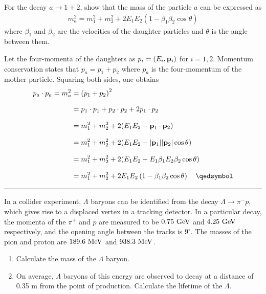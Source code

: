 
\begin{problem}{2.6}\label{p2.6}
   For the decay $a\to1+2$, show that the mass of the particle $a$ can be expressed as 
   \begin{align*}
        m_a^2 = m_1^2+m_2^2 + 2E_1E_2\left( 1 - \beta_1\beta_2 \cos\theta \right)
   \end{align*}
   where $\beta_1$ and $\beta_2$ are the velocities of the daughter particles and $\theta$ is the angle between them.
\end{problem}
    
\begin{solution}
    Let the four-momenta of the daughters as $p_i = \left( E_i,\mathbf{p}_i \right)$ for $i=1,2$. Momentum conservation states that $p_a = p_1 + p_2$ where $p_a$ is the four-momentum of the mother particle.
    Squaring both sides, one obtains 
    \begin{align*}
        p_a \cdot p_a = m_a^2 &= \left( p_1 + p_2 \right)^2 \\[0.1in]
                              &= p_1 \cdot p_1 + p_2 \cdot p_2 + 2 p_1 \cdot p_2 \\[0.1in]
                              &= m_1^2 + m_2^2 + 2 (E_1E_2 - \boldp_1 \cdot \boldp_2) \\[0.1in]
                              &= m_1^2 + m_2^2 + 2 (E_1E_2 - |\boldp_1||\boldp_2|\cos\theta  ) \\[0.1in]
                              &= m_1^2 + m_2^2 + 2 (E_1E_2 - E_1\beta_1E_2\beta_2\cos\theta  ) \\[0.1in]
                              &= m_1^2+m_2^2 + 2E_1E_2\left( 1 - \beta_1\beta_2 \cos\theta \right) \qed 
    \end{align*}
\end{solution} 
    
\noindent\rule{7in}{1.5pt}


\begin{problem}{2.7}
In a collider experiment, $\Lambda$ baryons can be identified from the decay $\Lambda\to\pi^-p$, which gives rise to a displaced vertex in a tracking detector. In a particular decay, the momenta of the $\pi^+$ and $p$ are measured to be $0.75 \text{ GeV}$ and $4.25 \text{ GeV}$ respectively, and the opening angle between the tracks is $9^\circ$. The masses of the pion and proton are $189.6 \text{ MeV}$ and $938.3 \text{ MeV}$.
\begin{enumerate}[label=(\alph*)]
    \item Calculate the mass of the $\Lambda$ baryon.
    \item On average, $\Lambda$ baryons of this energy are observed to decay at a distance of 0.35 m from the point of production. Calculate the lifetime of the $\Lambda$.
\end{enumerate}
\end{problem}

